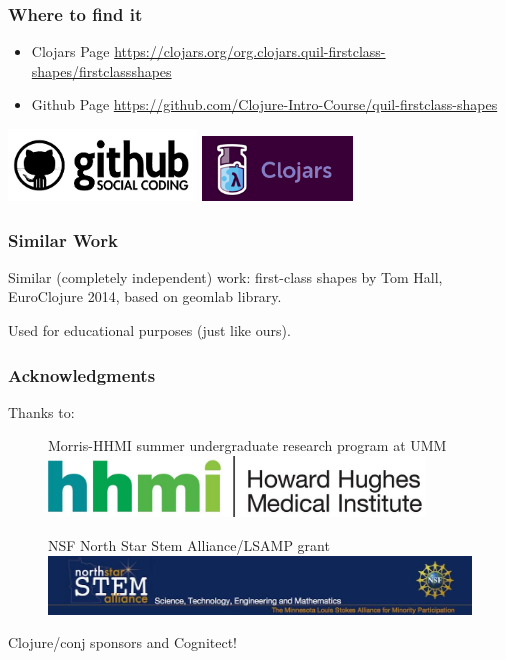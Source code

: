 \documentclass{beamer}
\newcommand{\comment}[1]{{\bf \tt  {#1}}}
\newcommand{\emcomment}[1]{\textcolor{ForestGreen}{\comment{Elena: {#1}}}}
\begin{document}
\begin{frame}
	\frametitle{Where to find it}
	\begin{itemize}
	\item Clojars Page
	\href{https://clojars.org/org.clojars.quil-firstclass-shapes/firstclassshapes}{https://clojars.org/org.clojars.quil-firstclass-shapes/firstclassshapes}
	\item Github Page
	\href{https://github.com/Clojure-Intro-Course/quil-firstclass-shapes}{https://github.com/Clojure-Intro-Course/quil-firstclass-shapes}
	\end{itemize}
	\includegraphics[width=5cm]{PresentationImages/github.png}
	\hspace{1cm}
	\includegraphics[width=4cm]{PresentationImages/clojars.png}
\end{frame}

\begin{frame}
	\frametitle{Similar Work}
Similar (completely independent) work: first-class shapes by Tom Hall, EuroClojure 2014, based on geomlab library. 

Used for educational purposes (just like ours).
\end{frame} 

\begin{frame}
\frametitle{Acknowledgments}
	{\large Thanks to:}
	\begin{figure}
		Morris-HHMI summer undergraduate research program at UMM \includegraphics[width=10cm]{PresentationImages/logoHHMI.jpg}
	\end{figure}
	\begin{figure}
		NSF North Star Stem Alliance/LSAMP grant 
		\includegraphics[width=12cm]{PresentationImages/logoStem.jpg}
	\end{figure}	
	{\centering \qquad Clojure/conj sponsors and Cognitect!}
\end{frame}
\end{document}
